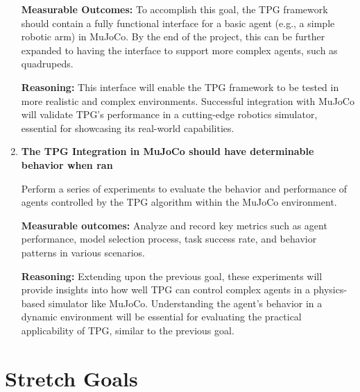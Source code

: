 \documentclass{article}
\begin{document}
\begin{enumerate}
\textbf{Measurable Outcomes:
} To accomplish this goal,  the TPG framework should contain a fully functional interface for a basic agent (e.g., a simple robotic arm) in MuJoCo. By the end of the project, this can be further expanded to having the interface to support more complex agents, such as quadrupeds.

\textbf{Reasoning:} This interface will enable the TPG framework to be tested in more realistic and complex environments. Successful integration with MuJoCo will validate TPG’s performance in a cutting-edge robotics simulator, essential for showcasing its real-world capabilities.


\item \textbf{The TPG Integration in MuJoCo should have determinable behavior when ran}

Perform a series of experiments to evaluate the behavior and performance of agents controlled by the TPG algorithm within the MuJoCo environment.

\textbf{Measurable outcomes:} Analyze and record key metrics such as agent performance, model selection process, task success rate, and behavior patterns in various scenarios. 

\textbf{Reasoning:} Extending upon the previous goal, these experiments will provide insights into how well TPG can control complex agents in a physics-based simulator like MuJoCo. Understanding the agent’s behavior in a dynamic environment will be essential for evaluating the practical applicability of TPG, similar to the previous goal. 


\end{enumerate}




\section{Stretch Goals}
\end{document}
